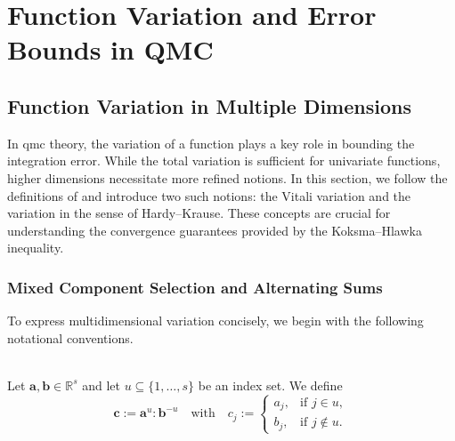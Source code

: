 \chapter{Function Variation and Error Bounds in QMC}
\label{chapter3}
\section{Function Variation in Multiple Dimensions}

In \acf{qmc} theory, the variation of a function plays a key role in bounding
the integration error. While the total variation is sufficient for univariate
functions, higher dimensions necessitate more refined notions. In this section,
we follow the definitions of \cite{owen2005multidimensional} and introduce two such notions: the Vitali variation and the variation in the sense of Hardy--Krause. These concepts are crucial for understanding the convergence guarantees provided by the Koksma--Hlawka inequality.

\subsection{Mixed Component Selection and Alternating Sums}

To express multidimensional variation concisely, we begin with the following
notational conventions.

\begin{definition} \ \\
    \label{def:component_merge}
    Let $\boldsymbol{a}, \boldsymbol{b} \in \mathbb{R}^s$ and let $u \subseteq \{1, \dots, s\}$ be an index set. We define
    \begin{equation*}
        \boldsymbol{c} := \boldsymbol{a}^u : \boldsymbol{b}^{-u}
        \quad \text{with} \quad
        c_j := 
        \begin{cases}
            a_j, & \text{if } j \in u, \\
            b_j, & \text{if } j \notin u.
        \end{cases}
    \end{equation*}
\end{definition}

